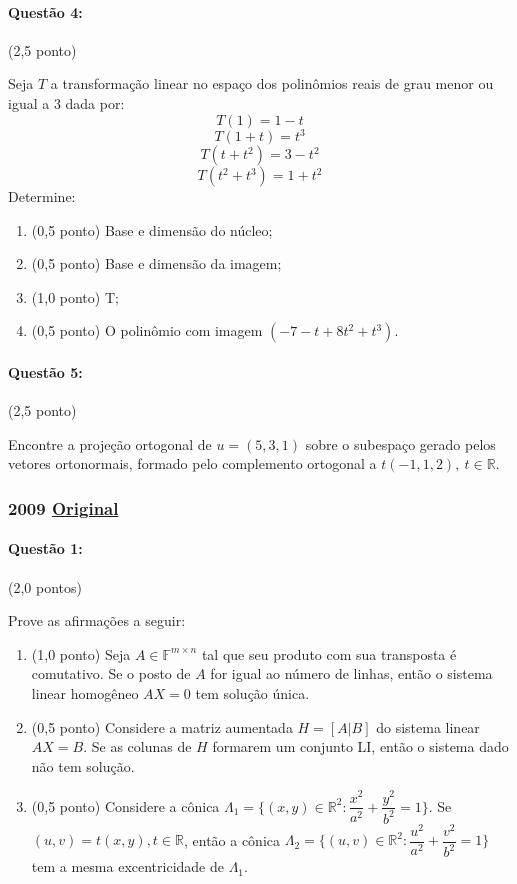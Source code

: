\documentclass[12pt,a4paper]{article}
\newcommand{\original}[1]{\tiny \href{#1}{Original} \normalsize}
\begin{document}
\paragraph{Questão 4:} (2,5 ponto)

Seja $T$ a transformação linear no espaço dos polinômios reais de grau menor ou igual a 3 dada por:
$$ T(1)=1-t$$
$$ T(1+t)=t^3 $$
$$ T(t+t^2)=3-t^2$$
$$ T(t^2+t^3)=1+t^2$$
Determine:

\begin{enumerate}[label=(\alph*)]

\item (0,5 ponto) Base e dimensão do núcleo;
\item (0,5 ponto) Base e dimensão da imagem;
\item (1,0 ponto) T;
\item (0,5 ponto) O polinômio com imagem $(-7-t+8t^2+t^3)$.


\end{enumerate}

\paragraph{Questão 5:} (2,5 ponto)

Encontre a projeção ortogonal de $u=(5,3,1)$ sobre o subespaço gerado pelos vetores ortonormais, formado pelo complemento ortogonal a $t(-1,1,2),\ t \in \mathbb{R}$. 

\newpage
\subsubsection{2009 \original{https://drive.google.com/file/d/1zOltEr8nhcCT0R6_XoEeaoAjNzivXqgi/view?usp=sharing}}

\paragraph{Questão 1:} (2,0 pontos)

Prove as afirmações a seguir:
\begin{enumerate}[label=(\alph*)]
\item (1,0 ponto) Seja $A \in \mathbb{F}^{m \times n}$ tal que seu produto com sua transposta é comutativo. Se o posto de $A$ for igual ao número de linhas, então o sistema linear homogêneo $AX=0$ tem solução única.
\item (0,5 ponto) Considere a matriz aumentada $H=[A|B]$ do sistema linear $AX=B$. Se as colunas de $H$ formarem um conjunto LI, então o sistema dado não tem solução.
\item (0,5 ponto) Considere a cônica $\Lambda_1 = \{(x,y) \in \mathbb{R}^2 : \dfrac{x^2}{a^2}+\dfrac{y^2}{b^2}=1 \}$. Se $(u,v)=t(x,y),t \in \mathbb{R}$, então a cônica $\Lambda_2=\{(u,v)\in \mathbb{R}^2 : \dfrac{u^2}{a^2}+\dfrac{v^2}{b^2}=1 \}$ tem a mesma excentricidade de $\Lambda_1$.
\end{enumerate}
\end{document}
